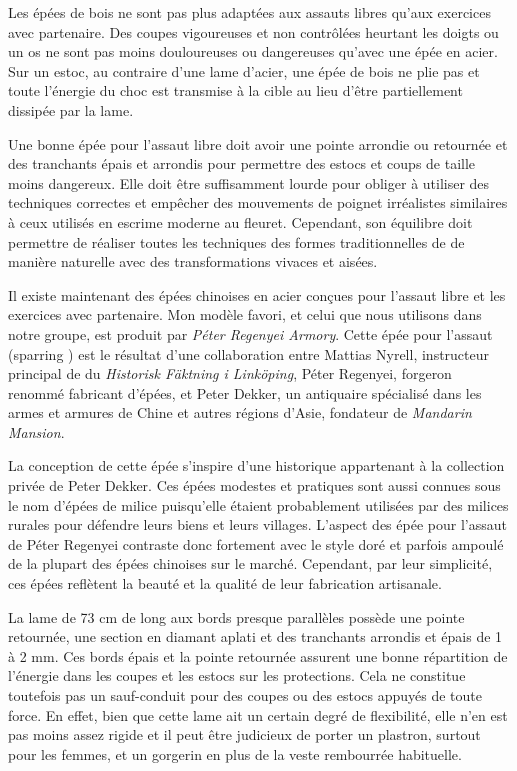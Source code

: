 Les épées de bois ne sont pas plus adaptées aux assauts libres qu'aux exercices avec partenaire. Des coupes vigoureuses et non contrôlées heurtant les doigts ou un os ne sont pas moins douloureuses ou dangereuses qu'avec une épée en acier. Sur un estoc, au contraire d’une lame d’acier, une épée de bois ne plie pas et toute l’énergie du choc est transmise à la cible au lieu d’être partiellement dissipée par la lame.

Une bonne épée pour l'assaut libre doit avoir une pointe arrondie ou retournée et des tranchants épais et arrondis pour permettre des estocs et coups de taille moins dangereux. Elle doit être suffisamment lourde pour obliger à utiliser des techniques correctes et empêcher des mouvements de poignet irréalistes similaires à ceux utilisés en escrime moderne au fleuret. Cependant, son équilibre doit permettre de réaliser toutes les techniques des formes traditionnelles de \Taijijian{} de manière naturelle avec des transformations vivaces et aisées.

Il existe maintenant des épées chinoises en acier conçues pour l'assaut libre et les exercices avec partenaire. Mon modèle favori, et celui que nous utilisons dans notre groupe, est produit par \textit{Péter Regenyei Armory}. Cette épée pour l'assaut (sparring \Jian{}) est le résultat d'une collaboration entre Mattias Nyrell, instructeur principal de \Jianfa{} du \textit{Historisk Fäktning i Linköping}, Péter Regenyei, forgeron renommé fabricant d'épées, et Peter Dekker, un antiquaire spécialisé dans les armes et armures de Chine et autres régions d'Asie, fondateur de \textit{Mandarin Mansion}.

La conception de cette épée s'inspire d'une \Tuanlianjian{} historique appartenant à la collection privée de Peter Dekker. Ces épées modestes et pratiques sont aussi connues sous le nom d'épées de milice puisqu'elle étaient probablement utilisées par des milices rurales pour défendre leurs biens et leurs villages. L'aspect des épée pour l'assaut de Péter Regenyei contraste donc fortement avec le style doré et parfois ampoulé de la plupart des épées chinoises sur le marché. Cependant, par leur simplicité, ces épées reflètent la beauté et la qualité de leur fabrication artisanale.

La lame de 73 cm de long aux bords presque parallèles possède une pointe retournée, une section en diamant aplati et des tranchants arrondis et épais de 1 à 2 mm. Ces bords épais et la pointe retournée assurent une bonne répartition de l'énergie dans les coupes et les estocs sur les protections. Cela ne constitue toutefois pas un sauf-conduit pour des coupes ou des estocs appuyés de toute force. En effet, bien que cette lame ait un certain degré de flexibilité, elle n'en est pas moins assez rigide et il peut être judicieux de porter un plastron, surtout pour les femmes, et un gorgerin en plus de la veste rembourrée habituelle.  

